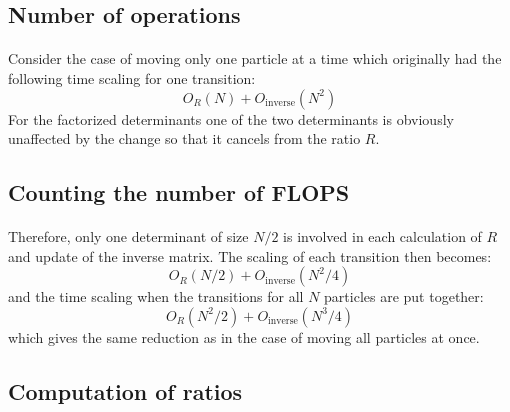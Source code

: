 \documentclass[%
twoside,                 %
final,                   %
10pt]{article}
\begin{document}
\subsection*{Number of operations}

\paragraph{}
Consider the case of moving only one particle  at a time which
originally had the following time scaling for one transition:
\[
O_R(N)+O_\mathrm{inverse}(N^2)
\]
For the factorized determinants one of the two determinants is
obviously unaffected by the change so that it cancels from the ratio
$R$.



\subsection*{Counting the number of FLOPS}

\paragraph{}
Therefore, only one determinant of size $N/2$ is involved in each
calculation of $R$ and update of the inverse matrix. The scaling of
each transition then becomes:
\[
O_R(N/2)+O_\mathrm{inverse}(N^2/4)
\]
and the time scaling when the transitions for all $N$ particles are
put together:
\[
O_R(N^2/2)+O_\mathrm{inverse}(N^3/4)
\]
which gives the same reduction as in the case of moving all particles
at once.



\subsection*{Computation of ratios}

\paragraph{}
\end{document}
